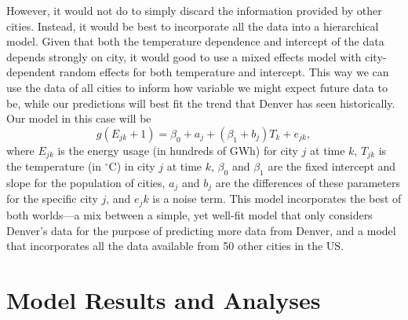 \documentclass[11pt]{article}
\begin{document}
However, it would not do to simply discard the information provided by other cities. Instead, it would be best to incorporate all the data into a hierarchical model. Given that both the temperature dependence and intercept of the data depends strongly on city, it would good to use a mixed effects model with city-dependent random effects for both temperature and intercept. This way we can use the data of all cities to inform how variable we might expect future data to be, while our predictions will best fit the trend that Denver has seen historically. Our model in this case will be
\begin{equation} \label{eqn:mod}
  g(E_{jk}+1) = \beta_0 + a_j + (\beta_1 + b_j)T_k + e_{jk},
\end{equation}
where $E_{jk}$ is the energy usage (in hundreds of GWh) for city $j$ at time $k$, $T_{jk}$ is the temperature (in $^\circ$C) in city $j$ at time $k$, $\beta_0$ and $\beta_1$ are the fixed intercept and slope for the population of cities, $a_j$ and $b_j$ are the differences of these parameters for the specific city $j$, and $e_jk$ is a noise term. This model incorporates the best of both worlds---a mix between a simple, yet well-fit model that only considers Denver's data for the purpose of predicting more data from Denver, and a model that incorporates all the data available from 50 other cities in the US.

\section{\label{sec:results}Model Results and Analyses}
\end{document}
